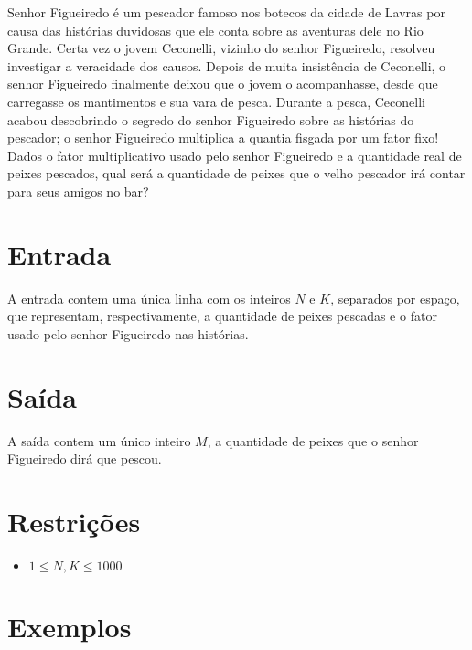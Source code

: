 Senhor Figueiredo é um pescador famoso nos botecos da cidade de Lavras por causa das histórias duvidosas que ele conta sobre as aventuras dele no Rio Grande.
Certa vez o jovem Ceconelli, vizinho do senhor Figueiredo, resolveu investigar a veracidade dos causos.
Depois de muita insistência de Ceconelli, o senhor Figueiredo finalmente deixou que o jovem o acompanhasse, desde que carregasse os mantimentos e sua vara de pesca.
Durante a pesca, Ceconelli acabou descobrindo o segredo do senhor Figueiredo sobre as histórias do pescador; o senhor Figueiredo multiplica a quantia fisgada por um fator fixo!
Dados o fator multiplicativo usado pelo senhor Figueiredo e a quantidade real de peixes pescados, qual será a quantidade de peixes que o velho pescador irá contar para seus amigos no bar?

\section*{Entrada}

A entrada contem uma única linha com os inteiros $N$ e $K$, separados por espaço, que representam, respectivamente, a quantidade de peixes pescadas e o fator usado pelo senhor Figueiredo nas histórias.

\section*{Saída}

A saída contem um único inteiro $M$, a quantidade de peixes que o senhor Figueiredo dirá que pescou.

\section*{Restrições}

\begin{itemize}
\item $1 \leq N,K \leq 1000$
\end{itemize}


\section*{Exemplos}

\exemplo
